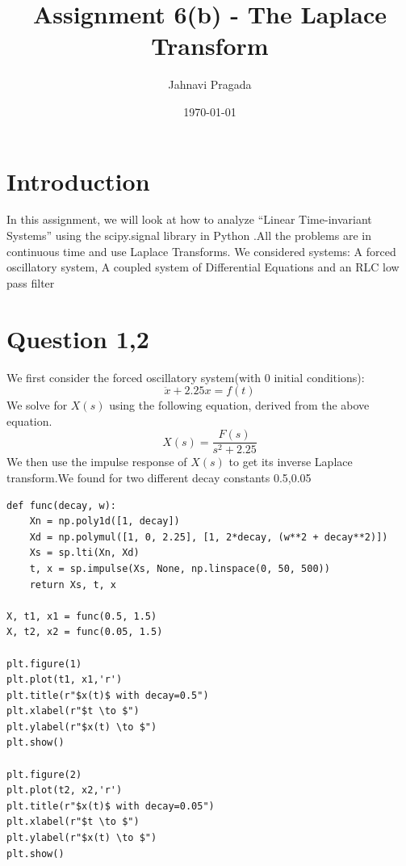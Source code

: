 \documentclass{article}
\title{Assignment 6(b) - The Laplace Transform}
\author{Jahnavi Pragada}
\date{\today}
\begin{document}
\maketitle

\section*{Introduction}
In this assignment, we will look at how to analyze “Linear Time-invariant Systems” using the scipy.signal library in Python .All the problems are in continuous time and use Laplace Transforms. We considered systems: A forced oscillatory system, A coupled system of Differential Equations and an RLC low pass filter  


\section*{Question 1,2}
We first consider the forced oscillatory system(with 0 initial conditions):
\begin{equation}
    \ddot x + 2.25x = f(t)
\end{equation}
We solve for $X(s)$ using the following equation, derived from the above equation.
\begin{equation}
    X(s) = \frac{F(s)}{s^2+2.25}
\end{equation}
We then use the impulse response of $X(s)$ to get its inverse Laplace transform.We found for two different decay constants 0.5,0.05



\begin{verbatim}
def func(decay, w):
    Xn = np.poly1d([1, decay])
    Xd = np.polymul([1, 0, 2.25], [1, 2*decay, (w**2 + decay**2)])
    Xs = sp.lti(Xn, Xd)
    t, x = sp.impulse(Xs, None, np.linspace(0, 50, 500))
    return Xs, t, x
    
X, t1, x1 = func(0.5, 1.5)
X, t2, x2 = func(0.05, 1.5)

plt.figure(1)
plt.plot(t1, x1,'r')
plt.title(r"$x(t)$ with decay=0.5")
plt.xlabel(r"$t \to $")
plt.ylabel(r"$x(t) \to $")
plt.show()

plt.figure(2)
plt.plot(t2, x2,'r')
plt.title(r"$x(t)$ with decay=0.05")
plt.xlabel(r"$t \to $")
plt.ylabel(r"$x(t) \to $")
plt.show()

\end{verbatim}
\end{document}
